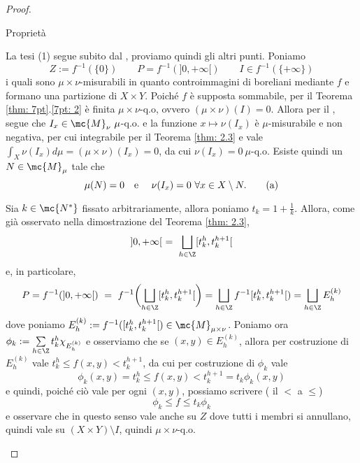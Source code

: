 \begin{proof}
\begin{itemize}
\begin{textbox}{Proprietà}
\begin{enumerate}[label=\eqref{eq:fub: \alph*}]
            \end{enumerate} 
        \end{textbox}
        La tesi (1) segue subito dal \lemmone, proviamo quindi gli altri punti. Poniamo 
        \[Z:=f^{-1}(\{0\})\qquad P = f^{-1}(]0,+\infty[)\qquad I\in f^{-1}(\{+\infty\})\]
        i quali sono $\mu\times\nu$-misurabili in quanto controimmagini di boreliani mediante $f$ e formano una partizione di $X\times Y$. Poiché $f$ è supposta sommabile, per il Teorema \ref{thm: 7pt}.\ref{7pt: 2} è finita $\mu\times \nu$-q.o, ovvero $(\mu\times \nu)(I)=0$. Allora per il \lemmone, segue che $I_x\in \mc{M}_\nu\ \mu$-q.o. e la funzione $x\mapsto \nu(I_x)$ è $\mu$-misurabile e non negativa, per cui integrabile per il Teorema \ref{thm: 2.3} e vale $\int_X\nu(I_x)d\mu=(\mu\times \nu)(I_x) = 0$, da cui $\nu(I_x)=0\ \mu$-q.o. Esiste quindi un $N\in \mc{M}_\mu$ tale che \[\mu(N)=0 \text{\quad e \quad}\nu(I_x)=0\ \forall x\in X\setminus N.\tag{a}\label{eq:fub: a}\]

        Sia $k\in \mc{N^*}$ fissato arbitrariamente, allora poniamo $t_k=1+\frac{1}{k}$. Allora, come già osservato nella dimostrazione del Teorema \ref{thm: 2.3}, 
        \[]0,+\infty[\ =\ \bigsqcup_{h\in \Z}[t_k^h, t_k^{h+1}[\]
        e, in particolare, 
        \[P=f^{-1}(]0,+\infty[)\ =\ f^{-1}\biggl(\bigsqcup_{h\in \Z}[t_k^h, t_k^{h+1}[ \biggr)= \bigsqcup_{h\in \Z}f^{-1}[t_k^h, t_k^{h+1}[) = \bigsqcup_{h\in \Z}E_h^{(k)}\]
        dove poniamo $E_h^{(k)}:=f^{-1}([t_k^h, t_k^{h+1}[) \in\mc{M}_{\mu\times\nu}$. Poniamo ora $\phi_k:=\sum\limits_{h\in \Z}t_k^h\chi_{E_h^{(k)}}$ e osserviamo che se $(x,y)\in E_h^{(k)}$, allora per costruzione di $E_h^{(k)}$ vale $t_k^h\leq f(x,y)<t_k^{h+1}$, da cui per costruzione di $\phi_k$ vale
        \[\phi_k(x,y) =t_k^h\leq f(x,y)<t_k^{h+1} = t_k\phi_k(x,y)\]
        e quindi, poiché ciò vale per ogni $(x,y)$, possiamo scrivere ( il $<$ a $\leq$)
        \[\phi_k\leq f\leq t_k\phi_k\tag{b}\label{eq:fub: b}\]
        e osservare che in questo senso vale anche su $Z$ dove tutti i membri si annullano, quindi vale su $(X\times Y)\setminus I$, quindi $\mu\times \nu$-q.o.

\end{itemize}
\end{proof}
